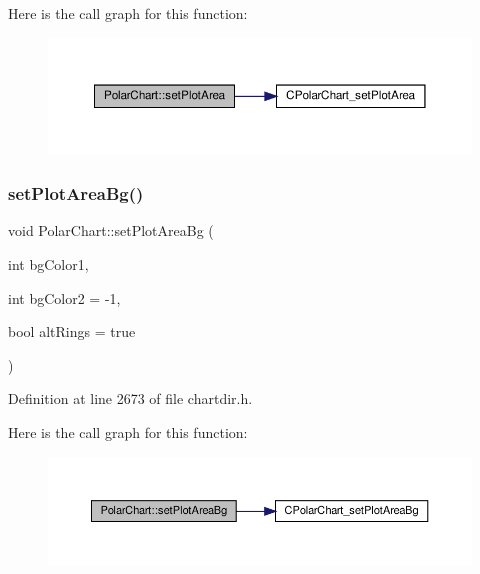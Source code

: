 Here is the call graph for this function\+:
\nopagebreak
\begin{figure}[H]
\begin{center}
\leavevmode
\includegraphics[width=350pt]{class_polar_chart_adc36a42598e36330c451bab063739494_cgraph}
\end{center}
\end{figure}
\mbox{\label{class_polar_chart_a4bb79336412c5a0407ca057713926ac8}} 
\subsubsection{\texorpdfstring{set\+Plot\+Area\+Bg()}{setPlotAreaBg()}}
{\footnotesize\ttfamily void Polar\+Chart\+::set\+Plot\+Area\+Bg (\begin{DoxyParamCaption}\item[{int}]{bg\+Color1,  }\item[{int}]{bg\+Color2 = {\ttfamily -\/1},  }\item[{bool}]{alt\+Rings = {\ttfamily true} }\end{DoxyParamCaption})\hspace{0.3cm}{\ttfamily [inline]}}



Definition at line 2673 of file chartdir.\+h.

Here is the call graph for this function\+:
\nopagebreak
\begin{figure}[H]
\begin{center}
\leavevmode
\includegraphics[width=350pt]{class_polar_chart_a4bb79336412c5a0407ca057713926ac8_cgraph}
\end{center}
\end{figure}
\mbox{\label{class_polar_chart_a46183032bdf951a3b7b940c38aceb30a}} 
